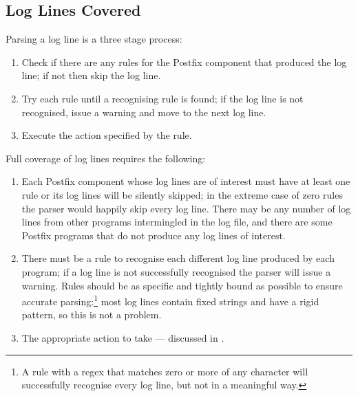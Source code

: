 \newpage{} %

\subsection{Log Lines Covered}

\label{log-lines-covered}

Parsing a log line is a three stage process:

\begin{enumerate}

    \item Check if there are any rules for the Postfix component that
        produced the log line; if not then skip the log line.

    \item Try each rule until a recognising rule is found; if the log line
        is not recognised, issue a warning and move to the next log line.

    \item Execute the action specified by the rule.

\end{enumerate}

Full coverage of log lines requires the following:

\begin{enumerate}

    \item Each Postfix component whose log lines are of interest must have
        at least one rule or its log lines will be silently skipped; in the
        extreme case of zero rules the parser would happily skip every log
        line.  There may be any number of log lines from other programs
        intermingled in the log file, and there are some Postfix programs
        that do not produce any log lines of interest.

    \item There must be a rule to recognise each different log line
        produced by each program; if a log line is not successfully
        recognised the parser will issue a warning.  Rules should be as
        specific and tightly bound as possible to ensure accurate
        parsing:\footnote{A rule with a regex that matches zero or more of
        any character will successfully recognise every log line, but not
        in a meaningful way.} most log lines contain fixed strings and have
        a rigid pattern, so this is not a problem.

    \item The appropriate action to take --- discussed in
        .

\end{enumerate}

